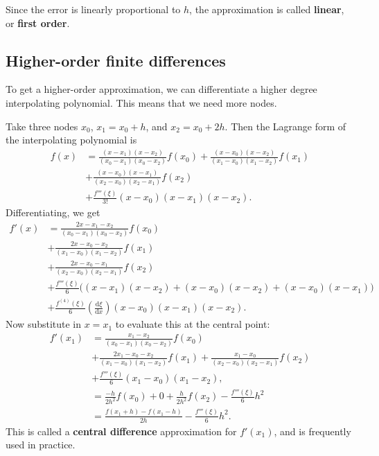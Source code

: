 \documentclass[
  letterpaper,
  DIV=11,
  numbers=noendperiod]{scrreprt}
\newenvironment{fbxSimple}[3]{\begin{tcolorbox}[enhanced, breakable,%
attach boxed title to top*={xshift=1.4pt},
boxed title style={boxrule=0.0mm, fuzzy shadow={1pt}{-1pt}{0mm}{0.1mm}{gray}, arc=.3em, rounded corners=east, sharp corners=west}, colframe=#1-color2, colbacktitle=#1-color1, colback = white, coltitle=black,  titlerule=0mm, toprule=0pt, bottomrule=.7pt, leftrule=.3em, rightrule=.7pt, outer arc=.3em,  	left=.5em, right=.5em, bottomtitle=1mm, toptitle=1mm,title=\textbf{#2}\hspace{0.5em}{#3}]}
{\end{tcolorbox}}
\begin{document}
Since the error is linearly proportional to \(h\), the approximation is
called \textbf{linear}, or \textbf{first order}.

\subsection{Higher-order finite
differences}\label{higher-order-finite-differences}

To get a higher-order approximation, we can differentiate a higher
degree interpolating polynomial. This means that we need more nodes.

\label{central-difference}
\begin{fbxSimple}{eg}{Example 4.2: }{Central difference}
\label{central-difference}
Take three nodes \(x_0\), \(x_1=x_0+h\), and \(x_2=x_0+2h\). Then the
Lagrange form of the interpolating polynomial is \[
\begin{aligned}
f(x) &= \frac{(x-x_1)(x-x_2)}{(x_0-x_1)(x_0-x_2)}f(x_0) + \frac{(x-x_0)(x-x_2)}{(x_1-x_0)(x_1-x_2)}f(x_1)\\ &+ \frac{(x-x_0)(x-x_1)}{(x_2-x_0)(x_2-x_1)}f(x_2) \\
&+ \frac{f'''(\xi)}{3!}(x-x_0)(x-x_1)(x-x_2).
\end{aligned}
\] Differentiating, we get \[
\begin{aligned}
f'(x) &= \frac{2x - x_1 - x_2}{(x_0-x_1)(x_0-x_2)}f(x_0)\\ &+ \frac{2x - x_0 - x_2}{(x_1-x_0)(x_1-x_2)}f(x_1)\\ &+ \frac{2x-x_0-x_1}{(x_2-x_0)(x_2-x_1)}f(x_2)\\
&+ \frac{f'''(\xi)}{6}\Big((x-x_1)(x-x_2) + (x-x_0)(x-x_2) + (x-x_0)(x-x_1) \Big) \\
&+ \frac{f^{(4)}(\xi)}{6}\left(\frac{\mathrm{d}\xi}{\mathrm{d}x}\right)(x-x_0)(x-x_1)(x-x_2).
\end{aligned}
\] Now substitute in \(x=x_1\) to evaluate this at the central point: \[
\begin{aligned}
f'(x_1) &= \frac{x_1 - x_2}{(x_0-x_1)(x_0-x_2)}f(x_0)\\ &+ \frac{2x_1 - x_0 - x_2}{(x_1-x_0)(x_1-x_2)}f(x_1) + \frac{x_1-x_0}{(x_2-x_0)(x_2-x_1)}f(x_2)\\
&+ \frac{f'''(\xi)}{6}(x_1-x_0)(x_1-x_2),\\
&= \frac{-h}{2h^2}f(x_0) + 0 + \frac{h}{2h^2}f(x_2) - \frac{f'''(\xi)}{6}h^2\\
&= \frac{f(x_1+h) - f(x_1-h)}{2h} - \frac{f'''(\xi)}{6}h^2.
\end{aligned}
\] This is called a \textbf{central difference} approximation for
\(f'(x_1)\), and is frequently used in practice.

\end{fbxSimple}
\end{document}
